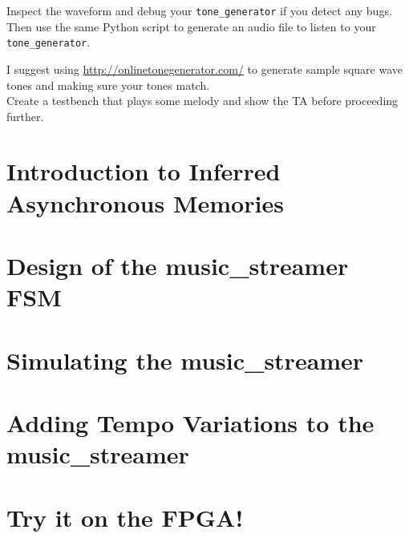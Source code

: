 \documentclass[11pt]{article}
\begin{document}
Inspect the waveform and debug your \verb|tone_generator| if you detect any bugs. Then use the same Python script to generate an audio file to listen to your \verb|tone_generator|.

I suggest using \url{http://onlinetonegenerator.com/} to generate sample square wave tones and making sure your tones match.\\

Create a testbench that plays some melody and show the TA before proceeding further.

\section{Introduction to Inferred Asynchronous Memories}

\section{Design of the music\_streamer FSM}

\section{Simulating the music\_streamer}

\section{Adding Tempo Variations to the music\_streamer}

\section{Try it on the FPGA!}
\end{document}
